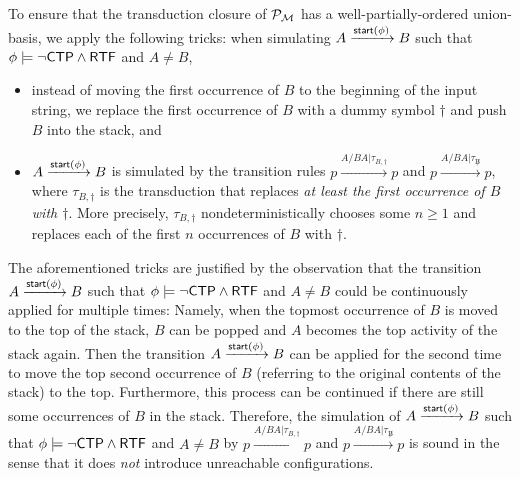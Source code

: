 To ensure that the transduction closure of ${\mathcal{P} }_{\mathcal{M} }$  has a well-partially-ordered union-basis, we
apply the following tricks: when simulating $A \xrightarrow{{\mathsf{start} }(\phi)}B$ such that $\phi \models \neg {\sf CTP} \wedge {\sf RTF}$ and $A \neq B$,
\begin{itemize}
\item instead of moving the first occurrence of $B$ to the beginning of the input string, we replace the first occurrence of $B$ with a dummy symbol $\dag$ and push $B$ into the stack, and
%
\item $A \xrightarrow{{\mathsf{start} }(\phi)}B$ is simulated by the transition rules $p \xrightarrow{A / BA | \tau_{B, \dag}} p$ and  $p \xrightarrow{A / BA | \tau_{\not B}} p$, where $\tau_{B, \dag}$ is the transduction that replaces \emph{at least the first occurrence of $B$ with $\dag$}. More precisely, $\tau_{B, \dag}$ nondeterministically chooses some $n \ge 1$ and replaces each of the first $n$ occurrences of $B$ with $\dag$.
\end{itemize}
The aforementioned tricks are justified by the observation that the transition $A \xrightarrow{{\mathsf{start} }(\phi)}B$ such that $\phi \models \neg {\sf CTP} \wedge {\sf RTF}$ and $A \neq B$ could be continuously applied for multiple times: Namely, when the topmost occurrence of $B$ is moved to the top of the stack, $B$ can be popped and $A$ becomes the top activity of the stack again. Then the transition $A \xrightarrow{{\mathsf{start} }(\phi)}B$ can be applied for the second time to move the top second occurrence of $B$  (referring to the original contents of the stack) to the top. Furthermore, this process can be continued if there are still some occurrences of $B$ in the stack. Therefore, the simulation of $A \xrightarrow{{\mathsf{start} }(\phi)}B$ such that $\phi \models \neg {\sf CTP} \wedge {\sf RTF}$ and $A \neq B$ by $p \xrightarrow{A / BA | \tau_{B, \dag}} p$ and  $p \xrightarrow{A / BA | \tau_{\not B}} p$ is sound in the sense that it does \emph{not} introduce unreachable configurations.


